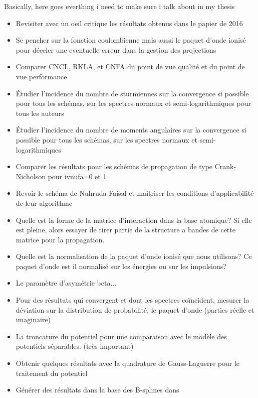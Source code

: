 \documentclass{article}
\begin{document}
Basically, here goes everthing i need to make sure 
i talk about in my thesis

\begin{itemize}
\item Revisiter avec un oeil critique les r\'esultats obtenus dans 
      le papier de 2016
\item Se pencher sur la fonction coulombienne mais aussi le paquet 
      d'onde ionis\'e pour d\'eceler une eventuelle erreur dans la 
      gestion des projections 
\item Comparer CNCL, RKLA, et CNFA du point de vue qualit\'e 
      et du point de vue performance 
\item \'Etudier l'incidence du nombre de sturmiennes sur la convergence 
      si possible pour tous les sch\'emas, sur les spectres normaux et
      semi-logarithmiques pour tous les auteurs
\item \'Etudier l'incidence du nombre de moments angulaires sur la convergence
       si possible pour tous les sch\'emas, sur les spectres normaux et
       semi-logarithmiques
\item Comparer les r\'esultats pour les sch\'emas de propagation de type 
      Crank-Nicholson pour ivnufa=0 et 1
\item Revoir le sch\'ema de Nuhruda-Faisal et ma\^itriser les conditions 
      d'applicabilit\'e de leur algorithme
\item Quelle est la forme de la matrice d'interaction dans la base 
      atomique? Si elle est pleine, alors essayer de 
      tirer partie de la structure a bandes de cette matrice 
      pour la propagation.
\item Quelle est la normalisation de la paquet d'onde ionis\'e que nous
      utilisons? Ce paquet d'onde est il normalis\'e sur les \'energies 
      ou sur les impulsions?
\item Le param\`etre d'asym\'etrie beta...
\item Pour des r\'esultats qui convergent et dont les spectres 
      co\"incident, mesurer la d\'eviation sur la distribution 
      de probabilit\'e, le paquet d'onde (parties r\'eelle et imaginaire)
\item La troncature du potentiel pour une comparaison avec le 
      mod\`ele des potentiels s\'eparables. (tr\`es important)
\item Obtenir quelques r\'esultats avec la quadrature de Gauss-Laguerre 
      pour le traitement du potentiel
\item G\'en\'erer des r\'esultats dans la base des B-splines dans 

\end{itemize}
\end{document}
